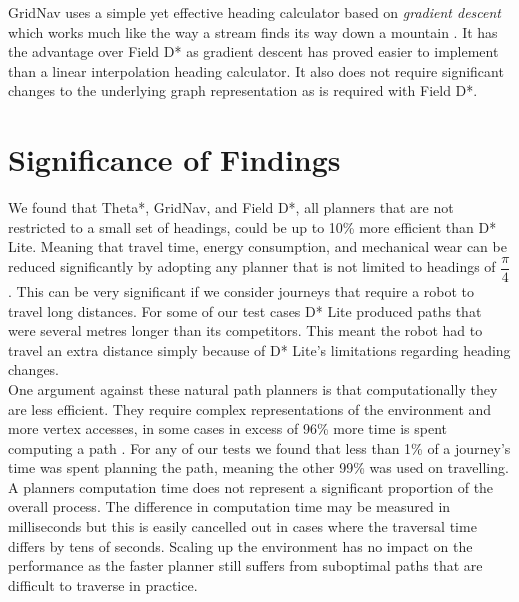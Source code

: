 \noindent
GridNav uses a simple yet effective heading calculator based on \textit{gradient descent} which works much like the way a stream finds its way down a mountain \cite{GRIDNAV95}. It has the advantage over Field D* as gradient descent has proved easier to implement than a linear interpolation heading calculator. It also does not require significant changes to the underlying graph representation as is required with Field D*.

\newpage

\section{Significance of Findings}
We found that Theta*, GridNav, and Field D*, all planners that are not restricted to a small set of headings, could be up to 10\% more efficient than D* Lite. Meaning that travel time, energy consumption, and mechanical wear can be reduced significantly by adopting any planner that is not limited to headings of $\dfrac{\pi}{4}$. This can be very significant if we consider journeys that require a robot to travel long distances. For some of our test cases D* Lite produced paths that were several metres longer than its competitors. This meant the robot had to travel an extra distance simply because of D* Lite's limitations regarding heading changes.  \\

\noindent
One argument against these natural path planners is that computationally they are less efficient. They require complex representations of the environment and more vertex accesses, in some cases in excess of 96\% more time is spent computing a path \cite{FIELD}. For any of our tests we found that less than 1\% of a journey's time was spent planning the path, meaning the other 99\% was used on travelling. A planners computation time does not represent a significant proportion of the overall process. The difference in computation time may be measured in milliseconds but this is easily cancelled out in cases where the traversal time differs by tens of seconds. Scaling up the environment has no impact on the performance as the faster planner still suffers from suboptimal paths that are difficult to traverse in practice.